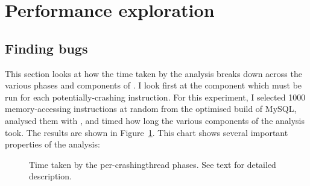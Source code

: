 \section{Performance exploration}
\label{sect:eval:time_details}

\subsection{Finding bugs}
This section looks at how the time taken by the analysis breaks down
across the various phases and components of {\implementation}.  I look
first at the component which must be run for each potentially-crashing
instruction.  For this experiment, I selected 1000 memory-accessing
instructions at random from the optimised build of MySQL, analysed
them with {\implementation}, and timed how long the various components
of the analysis took.  The results are shown in
Figure~\ref{fig:eval:time_breakdown:crashing}.  This chart shows
several important properties of the analysis:

\begin{figure}
  
  \caption{Time taken by the per-\gls{crashingthread} phases.  See
    text for detailed description.}
  \label{fig:eval:time_breakdown:crashing}
\end{figure}

